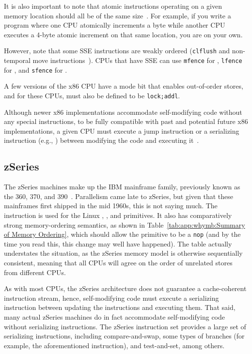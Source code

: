 It is also important to note that atomic instructions operating
on a given memory location should all be of the same
size~\cite[Section 8.1.2.2]{Intel64IA32v3A2011}.
For example, if you write a program where one CPU atomically increments
a byte while another CPU executes a 4-byte atomic increment on
that same location, you are on your own.

However, note that some SSE instructions are weakly ordered ({\tt clflush}
and non-temporal move instructions~\cite{IntelXeonV2b-96a}).
CPUs that have SSE can use {\tt mfence} for ,
{\tt lfence} for , and {\tt sfence} for .

A few versions of the x86 CPU have a mode bit that enables out-of-order
stores, and for these CPUs,  must also be defined to
be {\tt lock;addl}.

Although newer x86 implementations accommodate self-modifying code
without any special instructions, to be fully compatible with
past and potential future x86 implementations, a given CPU must
execute a jump instruction or a serializing instruction (e.g., )
between modifying the code and executing
it~\cite[Section 8.1.3]{Intel64IA32v3A2011}.

\subsection{zSeries}

The zSeries machines make up the IBM\textsuperscript{\texttrademark}
mainframe family, previously
known as the 360, 370, and 390~\cite{IBMzSeries04a}.
Parallelism came late to zSeries, but given that these mainframes first
shipped in the mid 1960s, this is not saying much.
The  instruction is used for the Linux ,
, and  primitives.
It also has comparatively strong memory-ordering semantics, as shown in
Table~\ref{tab:app:whymb:Summary of Memory Ordering}, which should allow the
 primitive to be a {\tt nop} (and by the time you read this,
this change may well have happened).
The table actually understates the situation, as the zSeries memory model
is otherwise sequentially consistent, meaning that all CPUs
will agree on the order of unrelated stores from different CPUs.

As with most CPUs, the zSeries architecture does not guarantee a
cache-coherent instruction stream, hence,
self-modifying code must execute a serializing instruction between updating
the instructions and executing them.
That said, many actual zSeries machines do in fact accommodate self-modifying
code without serializing instructions.
The zSeries instruction set provides a large set of serializing instructions,
including compare-and-swap, some types of branches (for example, the
aforementioned  instruction), and test-and-set,
among others.

